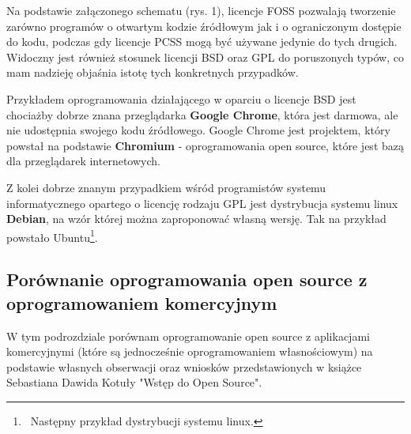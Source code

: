 \documentclass{article}
\begin{document}
Na podstawie załączonego schematu (rys. 1), licencje FOSS pozwalają tworzenie zarówno programów o otwartym kodzie źródłowym jak i o ograniczonym dostępie do kodu, podczas gdy licencje PCSS mogą być używane jedynie do tych drugich. Widoczny jest również stosunek licencji BSD oraz GPL do poruszonych typów, co mam nadzieję objaśnia istotę tych konkretnych przypadków.

Przykładem oprogramowania działającego w oparciu o licencje BSD jest chociażby dobrze znana przeglądarka \textbf{Google Chrome}, która jest darmowa, ale nie udostępnia swojego kodu źródłowego. Google Chrome jest projektem, który powstał na podstawie \textbf{Chromium} - oprogramowania open source, które jest bazą dla przeglądarek internetowych\cite{wikipedia3}.

Z kolei dobrze znanym przypadkiem wśród programistów systemu informatycznego opartego o licencję rodzaju GPL jest dystrybucja systemu linux \textbf{Debian}, na wzór której można zaproponować własną wersję\cite{Kotula}. Tak na przykład powstało Ubuntu\footnote{\, Następny przykład dystrybucji systemu linux.}. \newpage

\subsection{Porównanie oprogramowania open source z oprogramowaniem komercyjnym}

W tym podrozdziale porównam oprogramowanie open source z aplikacjami komercyjnymi (które są jednocześnie oprogramowaniem własnościowym) na podstawie własnych obserwacji oraz wniosków przedstawionych w książce Sebastiana Dawida Kotuły "Wstęp do Open Source".
\end{document}
